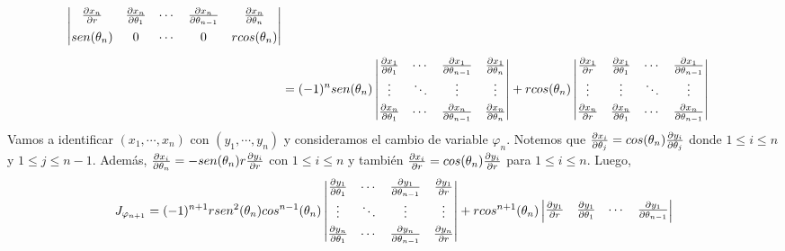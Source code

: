 \documentclass{article}
\begin{document}
\begin{enumerate}
\begin{align*}
\begin{vmatrix}
            \frac{\partial x_{n}}{\partial r} & \frac{\partial x_{n}}{\partial\theta_{1}} & \cdots & \frac{\partial x_{n}}{\partial\theta_{n-1}} & 
            \frac{\partial x_{n}}{\partial\theta_{n}} \\[2mm]
            sen(\theta_{n}) & 0 & \cdots & 0 & rcos(\theta_{n})
        \end{vmatrix} \\[2mm]
        &= (-1)^{n}sen(\theta_{n})\begin{vmatrix}
            \frac{\partial x_{1}}{\partial\theta_{1}} & \cdots & \frac{\partial x_{1}}{\partial\theta_{n-1}} & 
            \frac{\partial x_{1}}{\partial\theta_{n}} \\[1mm]
            \vdots & \ddots & \vdots & \vdots \\[1mm]
            \frac{\partial x_{n}}{\partial\theta_{1}} & \cdots & \frac{\partial x_{n}}{\partial\theta_{n-1}} & 
            \frac{\partial x_{n}}{\partial\theta_{n}}
        \end{vmatrix}+rcos(\theta_{n})\begin{vmatrix}
            \frac{\partial x_{1}}{\partial r} & \frac{\partial x_{1}}{\partial\theta_{1}} & \cdots & \frac{\partial x_{1}}{\partial\theta_{n-1}} \\[1mm]
            \vdots & \vdots & \ddots & \vdots \\[1mm]
            \frac{\partial x_{n}}{\partial r} & \frac{\partial x_{n}}{\partial\theta_{1}} & \cdots & \frac{\partial x_{n}}{\partial\theta_{n-1}}
        \end{vmatrix}
    \end{align*}
    Vamos a identificar $(x_{1},\cdots,x_{n})$ con $(y_{1},\cdots,y_{n})$ y consideramos el cambio 
    de variable $\varphi_{n}$. Notemos que $\frac{\partial x_{i}}{\partial\theta_{j}}=cos(\theta_{n})\frac{\partial y_{i}}{\partial\theta_{j}}$ donde $1\leq i\leq n$ y $1\leq j\leq n-1$. Además, $\frac{\partial x_{i}}{\partial\theta_{n}}
    =-sen(\theta_{n})r\frac{\partial y_{i}}{\partial r}$ con $1\leq i\leq n$ y también $\frac{\partial x_{i}}{\partial r}
    =cos(\theta_{n})\frac{\partial y_{i}}{\partial r}$ para $1\leq i\leq n$. Luego,
    \begin{equation*}
        J_{\varphi_{n+1}} = (-1)^{n+1}rsen^{2}(\theta_{n})cos^{n-1}(\theta_{n})\begin{vmatrix}
            \frac{\partial y_{1}}{\partial\theta_{1}} & \cdots & \frac{\partial y_{1}}{\partial\theta_{n-1}} & 
            \frac{\partial y_{1}}{\partial r} \\[1mm]
            \vdots & \ddots & \vdots & \vdots \\[1mm]
            \frac{\partial y_{n}}{\partial\theta_{1}} & \cdots & \frac{\partial y_{n}}{\partial\theta_{n-1}} & 
            \frac{\partial y_{n}}{\partial r}
        \end{vmatrix}+rcos^{n+1}(\theta_{n})\begin{vmatrix}
            \frac{\partial y_{1}}{\partial r} & \frac{\partial y_{1}}{\partial\theta_{1}} & \cdots & \frac{\partial y_{1}}{\partial\theta_{n-1}} \\[1mm]

\end{vmatrix}
\end{equation*}
\end{enumerate}
\end{document}

